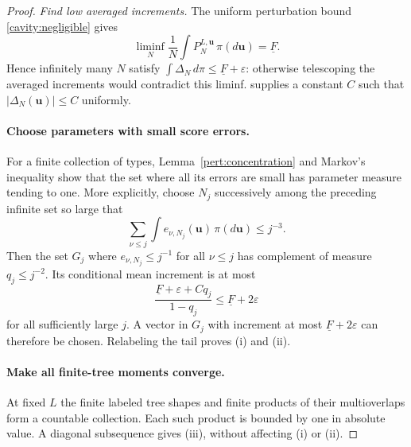 
\begin{proof}
\emph{Find low averaged increments.}
The uniform perturbation bound \eqref{cavity:negligible} gives
\[
 \liminf_N\frac1N\int P_N^{L,\mathbf u}\,\pi(d\mathbf u)=\underline F.
\]
Hence infinitely many $N$ satisfy
$\int\Delta_N\,d\pi\leq \underline F+\varepsilon$: otherwise telescoping the
averaged increments would contradict this liminf.  
supplies a constant $C$ such that
$|\Delta_N(\mathbf u)|\leq C$ uniformly.

\paragraph{Choose parameters with small score errors.}
For a finite collection of types, Lemma~\ref{pert:concentration} and
Markov's inequality show that the set where all its errors are small
has parameter measure tending to one.  More explicitly, choose
$N_j$ successively among the preceding infinite set so large that
\[
 \sum_{\nu\leq j}\int e_{\nu,N_j}(\mathbf u)\,\pi(d\mathbf u)
 \leq j^{-3}.
\]
Then the set $G_j$ where $e_{\nu,N_j}\leq j^{-1}$ for all $\nu\leq j$
has complement of measure $q_j\leq j^{-2}$.  Its conditional mean
increment is at most
\[
 \frac{\underline F+\varepsilon+Cq_j}{1-q_j}
 \leq \underline F+2\varepsilon
\]
for all sufficiently large $j$.  A vector in $G_j$ with increment at
most $\underline F+2\varepsilon$ can therefore be chosen. Relabeling the tail
proves (i) and (ii).

\paragraph{Make all finite-tree moments converge.}
At fixed $L$ the finite labeled tree
shapes and finite products of their multioverlaps form a countable
collection.  Each such product is bounded by one in absolute value.
A diagonal subsequence gives (iii), without affecting (i) or (ii).
\end{proof}

